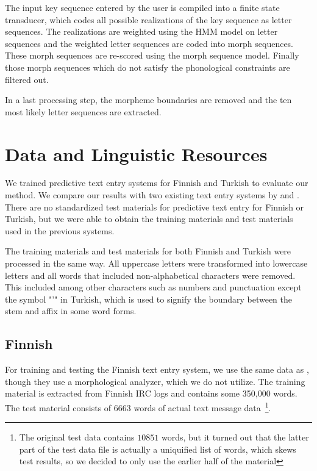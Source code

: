 \documentclass{llncs}
\begin{document}
The input key sequence entered by the user is compiled into a finite state
transducer, which codes all possible realizations of the key sequence
as letter sequences. The realizations are weighted using the HMM
model on letter sequences and the weighted letter sequences are coded
into morph sequences. These morph sequences are re-scored using the
morph sequence model. Finally those morph sequences which do not
satisfy the phonological constraints are filtered out. 

In a last processing step, the morpheme boundaries are removed and the
ten most likely letter sequences are extracted.

\section{Data and Linguistic Resources}\label{data}

We trained predictive text entry systems for Finnish and Turkish to
evaluate our method. We compare our results with two existing text
entry systems by \cite{silfverberg/2011/cla} and
\cite{Tantug:2010}. There are no standardized test materials for
predictive text entry for Finnish or Turkish, but we were able to
obtain the training materials and test materials used in the previous
systems.

The training materials and test materials for both Finnish and Turkish
were processed in the same way. All uppercase letters were transformed
into lowercase letters and all words that included non-alphabetical
characters were removed. This included among other characters such as
numbers and punctuation except the symbol "'" in Turkish, which is
used to signify the boundary between the stem and affix in some word
forms.

\subsection{Finnish}

For training and testing the Finnish text entry system, we use the
same data as \cite{silfverberg/2011/cla}, though they use a
morphological analyzer, which we do not utilize. The training material
is extracted from Finnish IRC logs and contains some 350,000
words. The test material consists of $6663$ words of actual text
message data~\footnote{The original test data contains $10851$ words,
  but it turned out that the latter part of the test data file is
  actually a uniquified list of words, which skews test results, so we
  decided to only use the earlier half of the material}.
\end{document}
